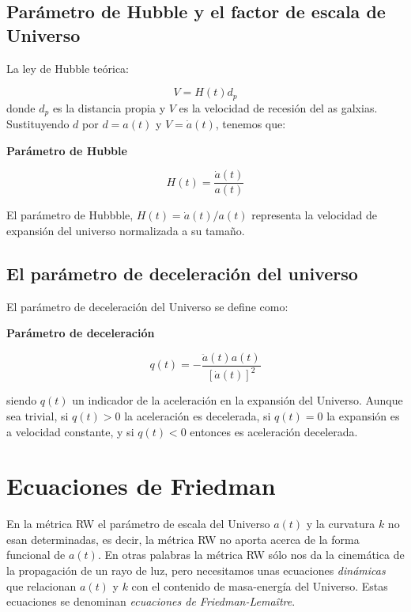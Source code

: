 \subsection{Parámetro de Hubble y el factor de escala de Universo}

La ley de Hubble teórica:

\begin{equation}
	V = H(t) d_p
\end{equation}
donde $d_p$ es la distancia propia y $V$ es la velocidad de recesión del as galxias. Sustituyendo $d$ por $d=a(t)$ y $V=\dot{a}(t)$, tenemos que:

\begin{Resaltar}
	\begin{center}
		\textbf{Parámetro de Hubble}
	\end{center}
	\begin{equation}
		H(t) = \frac{\dot{a}(t)}{a(t)}
	\end{equation}
\end{Resaltar}


El parámetro de Hubbble, $H(t)=\dot{a}(t)/a(t)$ representa la velocidad de expansión del universo normalizada a su tamaño.

\subsection{El parámetro de deceleración del universo}

El parámetro de deceleración del Universo se define como:

\begin{Resaltar}
	\begin{center}
		\textbf{Parámetro de deceleración}
	\end{center}
	\begin{equation}
		q(t) = - \frac{\ddot{a}(t)a(t)}{[\dot{a}(t)]^2}
	\end{equation}
\end{Resaltar}
siendo $q(t)$ un indicador de la aceleración en la expansión del Universo. Aunque sea trivial, si $q(t)>0$ la aceleración es decelerada, si $q(t)=0$ la expansión es a velocidad constante, y si $q(t)<0$ entonces es aceleración decelerada.



\section{Ecuaciones de Friedman}


En la métrica RW el parámetro de escala del Universo $a(t)$ y la curvatura $k$ no esan determinadas, es decir, la métrica RW no aporta acerca de la forma funcional de $a(t)$. En otras palabras la métrica RW sólo nos da la cinemática de la propagación de un rayo de luz, pero necesitamos unas ecuaciones \textit{dinámicas} que relacionan $a(t)$ y $k$ con el contenido de masa-energía del Universo. Estas ecuaciones se denominan \textit{ecuaciones de Friedman-Lemaître}.

